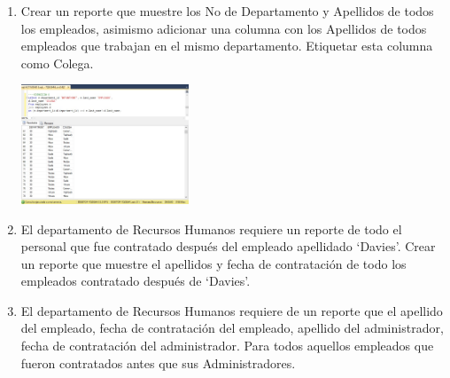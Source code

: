 \begin{enumerate}[1.]
	\item Crear un reporte que muestre los No de Departamento y Apellidos de todos los empleados, asimismo adicionar una columna con los Apellidos de todos empleados que trabajan en el mismo departamento. Etiquetar esta columna como Colega.
\begin{center}
	\includegraphics[width=5cm]{./Imagenes/8-EJERCICIO 6} 
	\end{center}

	\item El departamento de Recursos Humanos requiere un reporte de todo el personal que fue contratado después del empleado apellidado ‘Davies’. Crear un reporte que muestre el apellidos y fecha de contrataci\'on de todo los empleados contratado después de ‘Davies’.
	\item El departamento de Recursos Humanos requiere de un reporte que el apellido del empleado, fecha de contrataci\'on del empleado, apellido del administrador, fecha de contratación del administrador. Para todos aquellos empleados que fueron contratados antes que sus Administradores.
\end{enumerate}


